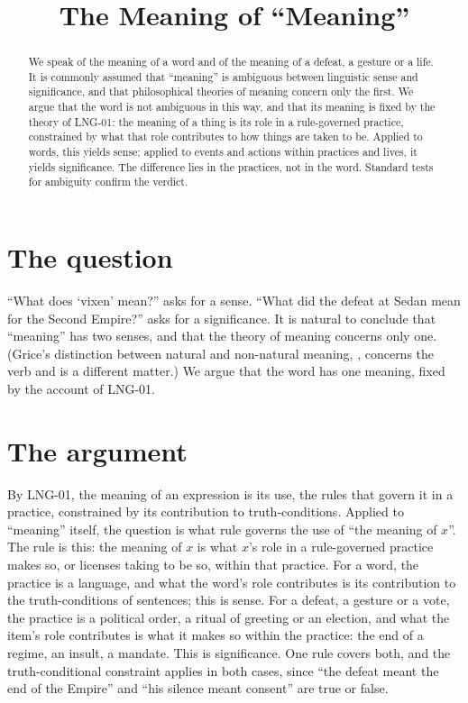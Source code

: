 \documentclass{situationist-preprint}
\title{The Meaning of \enquote{Meaning}}
\begin{document}
\maketitle

\begin{abstract}
We speak of the meaning of a word and of the meaning of a defeat, a gesture or a life. It is commonly assumed that \enquote{meaning} is ambiguous between linguistic sense and significance, and that philosophical theories of meaning concern only the first. We argue that the word is not ambiguous in this way, and that its meaning is fixed by the theory of LNG-01: the meaning of a thing is its role in a rule-governed practice, constrained by what that role contributes to how things are taken to be. Applied to words, this yields sense; applied to events and actions within practices and lives, it yields significance. The difference lies in the practices, not in the word. Standard tests for ambiguity confirm the verdict.
\end{abstract}

\section{The question}

\enquote{What does \enquote{vixen} mean?} asks for a sense. \enquote{What did the defeat at Sedan mean for the Second Empire?} asks for a significance. It is natural to conclude that \enquote{meaning} has two senses, and that the theory of meaning concerns only one. (Grice's distinction between natural and non-natural meaning, \citealp{Grice1957}, concerns the verb and is a different matter.) We argue that the word has one meaning, fixed by the account of LNG-01.

\section{The argument}

By LNG-01, the meaning of an expression is its use, the rules that govern it in a practice, constrained by its contribution to truth-conditions. Applied to \enquote{meaning} itself, the question is what rule governs the use of \enquote{the meaning of $x$}. The rule is this: the meaning of $x$ is what $x$'s role in a rule-governed practice makes so, or licenses taking to be so, within that practice. For a word, the practice is a language, and what the word's role contributes is its contribution to the truth-conditions of sentences; this is sense. For a defeat, a gesture or a vote, the practice is a political order, a ritual of greeting or an election, and what the item's role contributes is what it makes so within the practice: the end of a regime, an insult, a mandate. This is significance. One rule covers both, and the truth-conditional constraint applies in both cases, since \enquote{the defeat meant the end of the Empire} and \enquote{his silence meant consent} are true or false.
\end{document}
